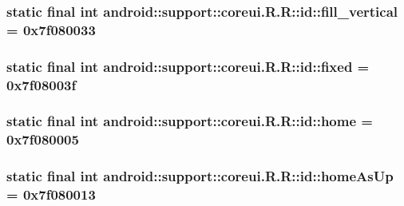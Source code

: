 \hypertarget{classandroid_1_1support_1_1coreui_1_1_r_1_1id_ab39e15f028428bd75630bdbd85d56c9}{
\subsubsection[{fill\_\-vertical}]{\setlength{\rightskip}{0pt plus 5cm}static final int android::support::coreui.R.R::id::fill\_\-vertical = 0x7f080033}}
\label{classandroid_1_1support_1_1coreui_1_1_r_1_1id_ab39e15f028428bd75630bdbd85d56c9}


\hypertarget{classandroid_1_1support_1_1coreui_1_1_r_1_1id_b3e66218922d105aa90b40c7efb69a38}{
\subsubsection[{fixed}]{\setlength{\rightskip}{0pt plus 5cm}static final int android::support::coreui.R.R::id::fixed = 0x7f08003f}}
\label{classandroid_1_1support_1_1coreui_1_1_r_1_1id_b3e66218922d105aa90b40c7efb69a38}


\hypertarget{classandroid_1_1support_1_1coreui_1_1_r_1_1id_54e707cf333501e830967f5532e1aa0a}{
\subsubsection[{home}]{\setlength{\rightskip}{0pt plus 5cm}static final int android::support::coreui.R.R::id::home = 0x7f080005}}
\label{classandroid_1_1support_1_1coreui_1_1_r_1_1id_54e707cf333501e830967f5532e1aa0a}


\hypertarget{classandroid_1_1support_1_1coreui_1_1_r_1_1id_b32f95310b97d8a8dd23cdb6fb94c742}{
\subsubsection[{homeAsUp}]{\setlength{\rightskip}{0pt plus 5cm}static final int android::support::coreui.R.R::id::homeAsUp = 0x7f080013}}
\label{classandroid_1_1support_1_1coreui_1_1_r_1_1id_b32f95310b97d8a8dd23cdb6fb94c742}


